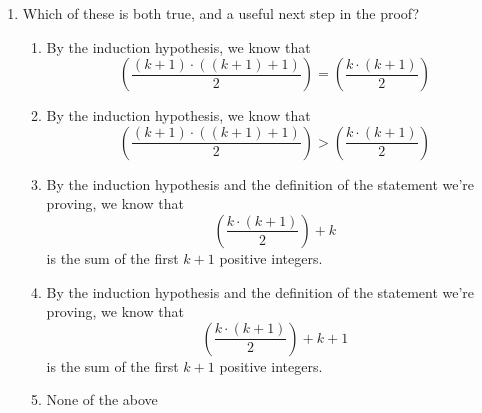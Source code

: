 \begin{enumerate}
    \item Which of these is both true, and a useful next step in the proof?
    
    \begin{enumerate}
        \item By the induction hypothesis, we know that $$\left( \dfrac{(k + 1) \cdot ((k + 1) + 1)}{2}\right) = \left(\dfrac{k \cdot (k + 1)}{2}\right)$$
        \item By the induction hypothesis, we know that $$\left( \dfrac{(k + 1) \cdot ((k + 1) + 1)}{2}\right) > \left(\dfrac{k \cdot (k + 1)}{2}\right)$$
        \item By the induction hypothesis and the definition of the statement we're proving, we know that $$\left(\dfrac{k \cdot (k + 1)}{2}\right) + k$$ is the sum of the first $k + 1$ positive integers.
        \item By the induction hypothesis and the definition of the statement we're proving, we know that $$\left(\dfrac{k \cdot (k + 1)}{2}\right) + k + 1$$ is the sum of the first $k + 1$ positive integers.
        \item None of the above
    \end{enumerate}
\end{enumerate}
